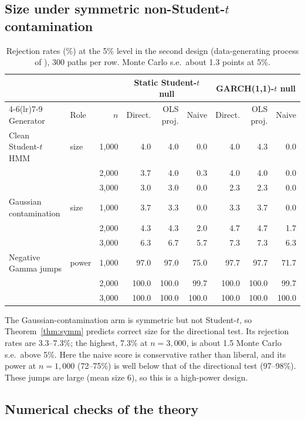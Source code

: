 \documentclass[11pt,a4paper]{article}
\theoremstyle{definition}
\theoremstyle{remark}
\begin{document}
\subsection{Size under symmetric non-Student-$t$ contamination}\label{sec:hmm9size}
\begin{table}[ht]\centering\footnotesize\setlength{\tabcolsep}{4pt}\caption{Rejection rates (\%) at the 5\% level in the second design (data-generating process of \citealp{giornoB}), 300 paths per row. Monte Carlo s.e.\ about 1.3 points at 5\%.}\label{tab:hmm9}
\begin{tabular}{llr rrr rrr}
\toprule
 & & & \multicolumn{3}{c}{Static Student-$t$ null} & \multicolumn{3}{c}{GARCH(1,1)-$t$ null}\\
\cmidrule(lr){4-6}\cmidrule(lr){7-9}
Generator & Role & $n$ & Direct. & OLS proj. & Naive & Direct. & OLS proj. & Naive\\
\midrule
Clean Student-$t$ HMM & size & 1,000 & 4.0 & 4.0 & 0.0 & 4.0 & 4.3 & 0.0\\
 & & 2,000 & 3.7 & 4.0 & 0.3 & 4.0 & 4.0 & 0.0\\
 & & 3,000 & 3.0 & 3.0 & 0.0 & 2.3 & 2.3 & 0.0\\
\addlinespace
Gaussian contamination & size & 1,000 & 3.7 & 3.3 & 0.0 & 3.3 & 3.7 & 0.0\\
 & & 2,000 & 4.3 & 4.3 & 2.0 & 4.7 & 4.7 & 1.7\\
 & & 3,000 & 6.3 & 6.7 & 5.7 & 7.3 & 7.3 & 6.3\\
\addlinespace
Negative Gamma jumps & power & 1,000 & 97.0 & 97.0 & 75.0 & 97.7 & 97.7 & 71.7\\
 & & 2,000 & 100.0 & 100.0 & 99.7 & 100.0 & 100.0 & 99.7\\
 & & 3,000 & 100.0 & 100.0 & 100.0 & 100.0 & 100.0 & 100.0\\
\bottomrule
\end{tabular}
\end{table}
The Gaussian-contamination arm is symmetric but not Student-$t$, so Theorem~\ref{thm:symm} predicts correct size for the directional test. Its rejection rates are 3.3--7.3\%; the highest, 7.3\% at $n=3{,}000$, is about 1.5 Monte Carlo s.e.\ above 5\%. Here the naive score is conservative rather than liberal, and its power at $n=1{,}000$ (72--75\%) is well below that of the directional test (97--98\%). These jumps are large (mean size 6), so this is a high-power design.

\subsection{Numerical checks of the theory}
\end{document}
